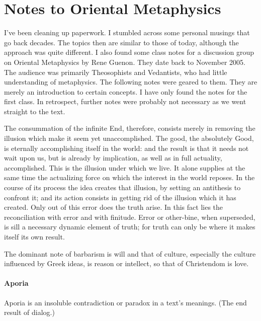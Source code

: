 \section{Notes to Oriental Metaphysics}

I've been cleaning up paperwork. I stumbled across some personal musings that go back decades. The topics then are similar to those of today, although the approach was quite different. I also found some class notes for a discussion group on Oriental Metaphysics by Rene Guenon. They date back to November 2005. The audience was primarily Theosophists and Vedantists, who had little understanding of metaphysics. The following notes were geared to them. They are merely an introduction to certain concepts. I have only found the notes for the first class. In retrospect, further notes were probably not necessary as we went straight to the text.

\begin{quotex}
The consummation of the infinite End, therefore, consists merely in removing the illusion which make it seem yet unaccomplished. The good, the absolutely Good, is eternally accomplishing itself in the world: and the result is that it needs not wait upon us, but is already by implication, as well as in full actuality, accomplished. This is the illusion under which we live. It alone supplies at the same time the actualizing force on which the interest in the world reposes. In the course of its process the idea creates that illusion, by setting an antithesis to confront it; and its action consists in getting rid of the illusion which it has created. Only out of this error does the truth arise. In this fact lies the reconciliation with error and with finitude. Error or other-bine, when superseded, is sill a necessary dynamic element of truth; for truth can only be where it makes itself its own result.


The dominant note of barbarism is will and that of culture, especially the culture influenced by Greek ideas, is reason or intellect, so that of Christendom is love.


\end{quotex}
\paragraph{Aporia}
Aporia is an insoluble contradiction or paradox in a text's meanings. (The end result of dialog.)

